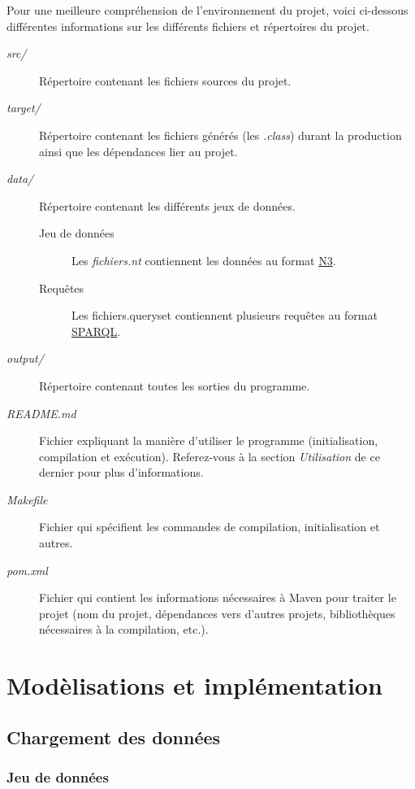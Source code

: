 \documentclass[12pt,titlepage]{article}
\begin{document}
Pour une meilleure compréhension de l'environnement du projet, voici ci-dessous différentes informations sur les différents fichiers et répertoires du projet.

\begin{description}
	\item[\textit{src/}] Répertoire contenant les fichiers sources du projet.
	\item[\textit{target/}] Répertoire contenant les fichiers générés (les \textit{.class}) durant la production ainsi que les dépendances lier au projet.
	\item[\textit{data/}] Répertoire contenant les différents jeux de données.
	\begin{description}
		\item[Jeu de données] Les \textit{fichiers.nt} contiennent les données au format \href{https://fr.wikipedia.org/wiki/Notation3}{N3}.
		\item[Requêtes] Les {fichiers.queryset} contiennent plusieurs requêtes au format \href{https://fr.wikipedia.org/wiki/SPARQL}{SPARQL}.
	\end{description}
		\item[\textit{output/}] Répertoire contenant toutes les sorties du programme.	
		\item[\textit{README.md}] Fichier expliquant la manière d'utiliser le programme (initialisation, compilation et exécution). Referez-vous à la section \textit{Utilisation} de ce dernier pour plus d'informations.
		\item[\textit{Makefile}] Fichier qui spécifient les commandes de compilation, initialisation et autres.
		\item[\textit{pom.xml}] Fichier qui contient les informations nécessaires à Maven pour traiter le projet (nom du projet, dépendances vers d'autres projets, bibliothèques nécessaires à la compilation, etc.).
\end{description}

\section{Modèlisations et implémentation}

\subsection{Chargement des données}

\subsubsection{Jeu de données}
\end{document}
